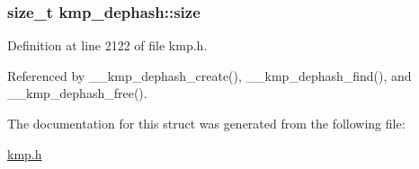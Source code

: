 \hypertarget{structkmp__dephash_a6c2dd618cc89b336b65c9e8b822aac5c}{
\subsubsection[{size}]{\setlength{\rightskip}{0pt plus 5cm}size\-\_\-t kmp\-\_\-dephash\-::size}}\label{structkmp__dephash_a6c2dd618cc89b336b65c9e8b822aac5c}


Definition at line 2122 of file kmp.\-h.



Referenced by \-\_\-\-\_\-kmp\-\_\-dephash\-\_\-create(), \-\_\-\-\_\-kmp\-\_\-dephash\-\_\-find(), and \-\_\-\-\_\-kmp\-\_\-dephash\-\_\-free().



The documentation for this struct was generated from the following file\-:\begin{DoxyCompactItemize}
\item 
\hyperlink{kmp_8h}{kmp.\-h}\end{DoxyCompactItemize}
